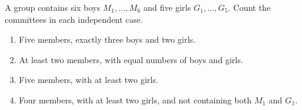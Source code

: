 A group contains six boys $M_1,\ldots,M_6$ and five girls $G_1,\ldots,G_5$. Count the committees in each independent case.\begin{enumerate}\item Five members, exactly three boys and two girls.\item At least two members, with equal numbers of boys and girls.\item Five members, with at least two girls.\item Four members, with at least two girls, and not containing both $M_1$ and $G_1$.\end{enumerate}
